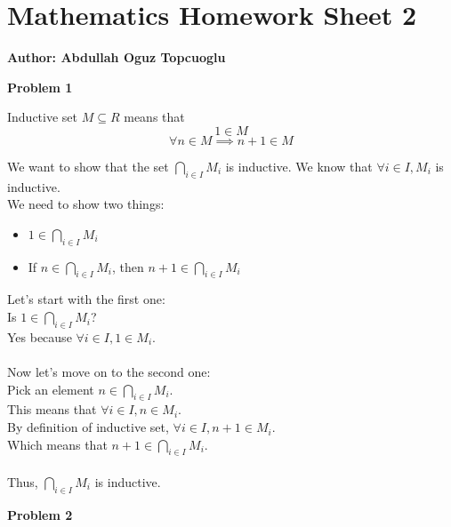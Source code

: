 \documentclass{article}
\begin{document}
\section*{\huge Mathematics Homework Sheet 2}
\begin{flushright}
   \textbf{Author: Abdullah Oguz Topcuoglu}
\end{flushright}

\begin{flushleft}
   \textbf{\Large Problem 1}
\end{flushleft}

Inductive set \(M \subseteq R\) means that
\[
   1 \in M
\]
\[
   \forall n \in M \implies n+1 \in M
\]

We want to show that the set \( \bigcap_{i \in I} M_i \) is inductive.
We know that \(\forall i \in I, M_i\) is inductive. \\
We need to show two things: \\
\begin{itemize}
   \item \(1 \in \bigcap_{i \in I} M_i\)
   \item If \(n \in \bigcap_{i \in I} M_i\), then \(n+1 \in \bigcap_{i \in I} M_i\)
\end{itemize}

Let's start with the first one: \\
Is \(1 \in \bigcap_{i \in I} M_i\)? \\
Yes because \(\forall i \in I, 1 \in M_i\). \\
\\
Now let's move on to the second one: \\
Pick an element \(n \in \bigcap_{i \in I} M_i\). \\
This means that \(\forall i \in I, n \in M_i\). \\
By definition of inductive set, \(\forall i \in I, n+1 \in M_i\). \\
Which means that \(n+1 \in \bigcap_{i \in I} M_i\). \\
\\
Thus, \(\bigcap_{i \in I} M_i\) is inductive.

\begin{flushleft}
   \textbf{\Large Problem 2}
\end{flushleft}
\end{document}
